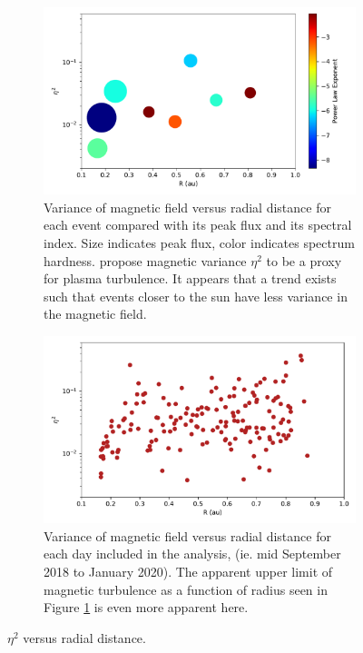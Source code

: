 \documentclass[letterpaper,11pt]{article}
\begin{document}
\begin{figure}[htbp]
\centering
\begin{subfigure}{1.\linewidth}
\centering
\includegraphics[width=0.9\linewidth]{figures/etasq_vs_R_events.pdf}
\caption{Variance of magnetic field versus radial distance for each event compared with its peak flux and its spectral index.  Size indicates peak flux, color indicates spectrum hardness. \citet{Schwadron1996} propose magnetic variance $\eta^2$ to be a proxy for plasma turbulence.  It appears that a trend exists such that events closer to the sun have less variance in the magnetic field.}
\label{fig:etasq_events}
\end{subfigure}
\begin{subfigure}{1.\linewidth}
\centering
\includegraphics[width=0.9\linewidth]{figures/etasq_vs_R.pdf}
\caption{Variance of magnetic field versus radial distance for each day included in the analysis, (ie. mid September 2018 to January 2020).  The apparent upper limit of magnetic turbulence as a function of radius seen in Figure \ref{fig:etasq_events} is even more apparent here.}
\label{fig:etasq_daily}
\end{subfigure}
\caption{$\eta^2$ versus radial distance.}
\label{fig:etasq}
\end{figure}
\end{document}
